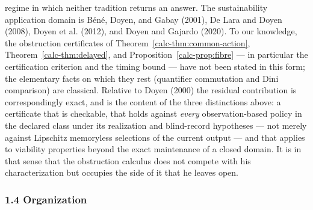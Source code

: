 \documentclass[10pt,twocolumn]{article}
\theoremstyle{definition}
\begin{document}
regime in which neither tradition returns an answer. The sustainability application domain is B\'en\'e, Doyen, and Gabay (2001), De Lara and Doyen (2008), Doyen et al. (2012), and Doyen and Gajardo (2020). To our knowledge, the obstruction certificates of Theorem~\ref{calc-thm:common-action}, Theorem~\ref{calc-thm:delayed}, and Proposition~\ref{calc-prop:fibre} --- in particular the certification criterion and the timing bound --- have not been stated in this form; the elementary facts on which they rest (quantifier commutation and Dini comparison) are classical. Relative to Doyen (2000) the residual contribution is correspondingly exact, and is the content of the three distinctions above: a certificate that is checkable, that holds against \emph{every} observation-based policy in the declared class under its realization and blind-record hypotheses --- not merely against Lipschitz memoryless selections of the current output --- and that applies to viability properties beyond the exact maintenance of a closed domain. It is in that sense that the obstruction calculus does not compete with his characterization but occupies the side of it that he leaves open.

\subsubsection{1.4 Organization}\label{calc-organization}
\end{document}
